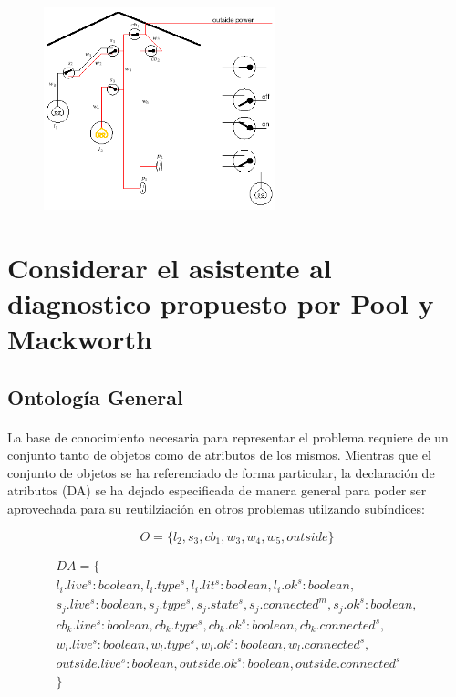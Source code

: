\documentclass[10pt, a4paper,spanish]{article}
\begin{document}
	\begin{figure}[H]
		\begin{center}
			\includegraphics[width=0.6\textwidth]{diagnostic-assistant}
		\end{center}
	\end{figure}

	\section{Considerar el asistente al diagnostico propuesto por Pool y Mackworth}

		\subsection{Ontología General}

			\paragraph{}
			La base de conocimiento necesaria para representar el problema requiere de un conjunto tanto de objetos como de atributos de los mismos. Mientras que el conjunto de objetos se ha referenciado de forma particular, la declaración de atributos (DA) se ha dejado especificada de manera general para poder ser aprovechada para su reutilziación en otros problemas utilzando subíndices:

			\begin{equation*}
				O = \{l_2, s_3, cb_1, w_3,w_4, w_5, outside\}
			\end{equation*}

			\begin{multline*}
				DA = \{ \\
					l_i.live^s:boolean, l_i.type^s, l_i.lit^s:boolean, l_i.ok^s:boolean, \\
					s_j.live^s:boolean, s_j.type^s, s_j.state^s, s_j.connected^m, s_j.ok^s:boolean, \\
					cb_k.live^s:boolean, cb_k.type^s, cb_k.ok^s:boolean, cb_k.connected^s, \\
					w_l.live^s:boolean, w_l.type^s, w_l.ok^s:boolean, w_l.connected^s, \\
					outside.live^s:boolean, outside.ok^s:boolean, outside.connected^s \\
				\}
			\end{multline*}
\end{document}
